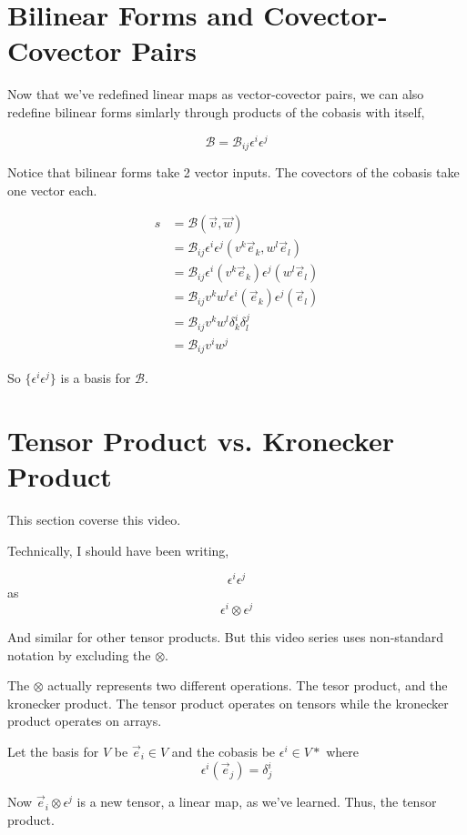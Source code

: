 \documentclass[12pt]{book}
\theoremstyle{plain}
\theoremstyle{definition}
\theoremstyle{ppart}
\theoremstyle{case}
\theoremstyle{solution}
\begin{document}
\section{Bilinear Forms and Covector-Covector Pairs}

Now that we've redefined linear maps as vector-covector pairs, we can also redefine bilinear forms simlarly through
products of the cobasis with itself,

\[ \mathcal{B} = \mathcal{B}_{ij} \epsilon^i \epsilon^j \]

Notice that bilinear forms take 2 vector inputs. The covectors of the cobasis take one vector each.

\begin{align*}
  s &= \mathcal{B}(\vec{v}, \vec{w}) \\
  &= \mathcal{B}_{ij} \epsilon^i \epsilon^j (v^k \vec{e}_k, w^l \vec{e}_l) \\
  &= \mathcal{B}_{ij} \epsilon^i (v^k \vec{e}_k) \epsilon^j (w^l \vec{e}_l) \\
  &= \mathcal{B}_{ij} v^k w^l \epsilon^i (\vec{e}_k) \epsilon^j (\vec{e}_l) \\
  &= \mathcal{B}_{ij} v^k w^l \delta^i_k \delta^j_l \\
  &= \mathcal{B}_{ij} v^i w^j 
\end{align*}

So $\{\epsilon^i \epsilon^j\}$ is a basis for $\mathcal{B}$.

\section{Tensor Product vs. Kronecker Product}

This section coverse this \cite{youtube:tensor11} video.

Technically, I should have been writing,

\[ \epsilon^i \epsilon^j \]
as
\[ \epsilon^i \otimes \epsilon^j \]

And similar for other tensor products. But this video series uses non-standard notation by
excluding the $\otimes$.

The $\otimes$ actually represents two different operations. The tesor product, and the kronecker product.
The tensor product operates on tensors while the kronecker product operates on arrays.

Let the basis for $V$ be $\vec{e}_i \in V$ and the cobasis be $\epsilon^i \in V*$ where
\[ \epsilon^i(\vec{e}_j) = \delta^i_j \]

Now $\vec{e}_i \otimes \epsilon^j$ is a new tensor, a linear map, as we've learned.
Thus, the tensor product.
\end{document}
